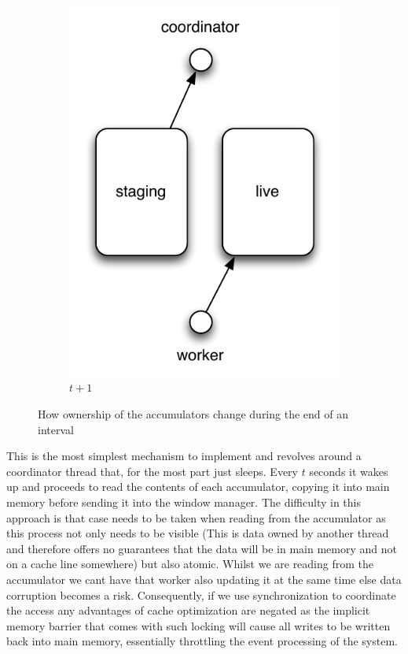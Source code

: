\documentclass[a4paper,11pt]{scrreprt}
\begin{document}
\begin{figure}[h!]
\begin{subfigure}[t]{2 in}
		\includegraphics[scale=0.7]{async-mode2.pdf}
		\caption{\(t+1\)}\label{fig:asyncmode.tplus1}		
	\end{subfigure}
	\caption{How ownership of the accumulators change during the end of an interval}
\end{figure}
This is the most simplest mechanism to implement and revolves around a coordinator thread that, for the most part just sleeps. Every \(t\) seconds it wakes up and proceeds to read the contents of each accumulator, copying it into main memory before sending it into the window manager. The difficulty in this approach is that case needs to be taken when reading from the accumulator as this process not only needs to be visible (This is data owned by another thread and therefore offers no guarantees that the data will be in main memory and not on a cache line somewhere) but also atomic. Whilst we are reading from the accumulator we cant have that worker also updating it at the same time else data corruption becomes a risk. Consequently, if we use synchronization to coordinate the access any advantages of cache optimization are negated as the implicit memory barrier that comes with such locking will cause all writes to be written back into main memory, essentially throttling the event processing of the system. 
\end{document}
